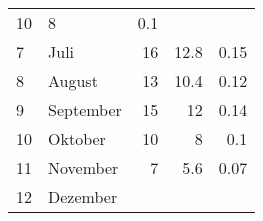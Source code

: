 \begin{longtable}{lXrrr}
       \num{10} &
       \num[round-mode=places,round-precision=2]{8} &
         \num[round-mode=places,round-precision=2]{0.1} \\

     7 &
     \multicolumn{1}{X}{ Juli   } &


       \num{16} &
       \num[round-mode=places,round-precision=2]{12.8} &
         \num[round-mode=places,round-precision=2]{0.15} \\

     8 &
     \multicolumn{1}{X}{ August   } &


       \num{13} &
       \num[round-mode=places,round-precision=2]{10.4} &
         \num[round-mode=places,round-precision=2]{0.12} \\

     9 &
     \multicolumn{1}{X}{ September   } &


       \num{15} &
       \num[round-mode=places,round-precision=2]{12} &
         \num[round-mode=places,round-precision=2]{0.14} \\

     10 &
     \multicolumn{1}{X}{ Oktober   } &


       \num{10} &
       \num[round-mode=places,round-precision=2]{8} &
         \num[round-mode=places,round-precision=2]{0.1} \\

     11 &
     \multicolumn{1}{X}{ November   } &


       \num{7} &
       \num[round-mode=places,round-precision=2]{5.6} &
         \num[round-mode=places,round-precision=2]{0.07} \\

     12 &
     \multicolumn{1}{X}{ Dezember   } &



\end{longtable}
